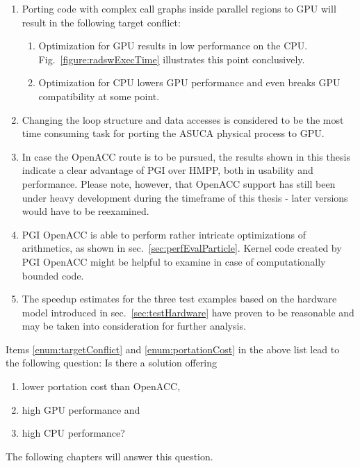 \begin{enumerate}
 \item \label{enum:targetConflict} Porting code with complex call graphs inside parallel regions to GPU will result in the following target conflict:
  \begin{enumerate}
    \item Optimization for GPU results in low performance on the CPU. Fig.~\ref{figure:radswExecTime} illustrates this point conclusively.
    \item Optimization for CPU lowers GPU performance and even breaks GPU compatibility at some point.
  \end{enumerate}
 \item \label{enum:portationCost} Changing the loop structure and data accesses is considered to be the most time consuming task for porting the ASUCA physical process to GPU.
 \item In case the OpenACC route is to be pursued, the results shown in this thesis indicate a clear advantage of PGI over HMPP, both in usability and performance. Please note, however, that OpenACC support has still been under heavy development during the timeframe of this thesis - later versions would have to be reexamined.
 \item PGI OpenACC is able to perform rather intricate optimizations of arithmetics, as shown in sec.~\ref{sec:perfEvalParticle}. Kernel code created by PGI OpenACC might be helpful to examine in case of computationally bounded code.
 \item The speedup estimates for the three test examples based on the hardware model introduced in sec.~\ref{sec:testHardware} have proven to be reasonable and may be taken into consideration for further analysis.
\end{enumerate}

Items \ref{enum:targetConflict} and \ref{enum:portationCost} in the above list lead to the following question: Is there a solution offering
\begin{enumerate}
 \item lower portation cost than OpenACC,
 \item high GPU performance and
 \item high CPU performance?
\end{enumerate}

The following chapters will answer this question.